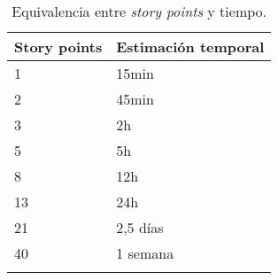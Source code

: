 \begin{longtable}[]{@{}ll@{}}
\toprule
\begin{minipage}[b]{0.22\columnwidth}\raggedright\strut
Story points\strut
\end{minipage} & \begin{minipage}[b]{0.31\columnwidth}\raggedright\strut
Estimación temporal\strut
\end{minipage}\tabularnewline
\midrule
\endhead
\begin{minipage}[t]{0.22\columnwidth}\raggedright\strut
1\strut
\end{minipage} & \begin{minipage}[t]{0.31\columnwidth}\raggedright\strut
15min\strut
\end{minipage}\tabularnewline
\begin{minipage}[t]{0.22\columnwidth}\raggedright\strut
2\strut
\end{minipage} & \begin{minipage}[t]{0.31\columnwidth}\raggedright\strut
45min\strut
\end{minipage}\tabularnewline
\begin{minipage}[t]{0.22\columnwidth}\raggedright\strut
3\strut
\end{minipage} & \begin{minipage}[t]{0.31\columnwidth}\raggedright\strut
2h\strut
\end{minipage}\tabularnewline
\begin{minipage}[t]{0.22\columnwidth}\raggedright\strut
5\strut
\end{minipage} & \begin{minipage}[t]{0.31\columnwidth}\raggedright\strut
5h\strut
\end{minipage}\tabularnewline
\begin{minipage}[t]{0.22\columnwidth}\raggedright\strut
8\strut
\end{minipage} & \begin{minipage}[t]{0.31\columnwidth}\raggedright\strut
12h\strut
\end{minipage}\tabularnewline
\begin{minipage}[t]{0.22\columnwidth}\raggedright\strut
13\strut
\end{minipage} & \begin{minipage}[t]{0.31\columnwidth}\raggedright\strut
24h\strut
\end{minipage}\tabularnewline
\begin{minipage}[t]{0.22\columnwidth}\raggedright\strut
21\strut
\end{minipage} & \begin{minipage}[t]{0.31\columnwidth}\raggedright\strut
2,5 días\strut
\end{minipage}\tabularnewline
\begin{minipage}[t]{0.22\columnwidth}\raggedright\strut
40\strut
\end{minipage} & \begin{minipage}[t]{0.31\columnwidth}\raggedright\strut
1 semana\strut
\end{minipage}\tabularnewline
\bottomrule
\caption{Equivalencia entre \emph{story points} y tiempo.}
\end{longtable}


